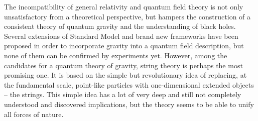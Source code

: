 \documentclass[draft]{phd}
\begin{document}
		The incompatibility of general relativity and quantum field theory is not only unsatisfactory from a theoretical perspective, but hampers the construction of a consistent theory of quantum gravity and the understanding of black holes.
		Several extensions of Standard Model and brand new frameworks have been proposed in order to incorporate gravity into a quantum field description, but none of them can be confirmed by experiments yet. 
		However, among the candidates for a quantum theory of gravity, string theory is perhaps the most promising one. 
		It is based on the simple but revolutionary idea of replacing, at the fundamental scale, point-like particles with one-dimensional extended objects -- the strings.
		This simple idea has a lot of very deep and still not completely understood and discovered implications, but the theory seems to be able to unify all forces of nature.
				\begin{figure}[h]
					\centering
				\end{figure}
			
\end{document}
